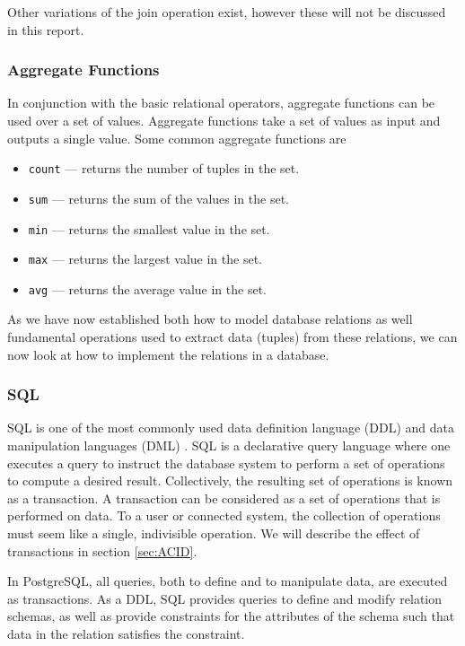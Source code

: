 Other variations of the join operation exist\cite{DBSBook}, however these will not be discussed in this report.\\
\subsubsection*{Aggregate Functions}
In conjunction with the basic relational operators, aggregate functions can be used over a set of values.
Aggregate functions take a set of values as input and outputs a single value\cite{DBSBook}. Some common aggregate functions are 
\begin{itemize} \label{aggregateFunctions}
    \item \texttt{count} --- returns the number of tuples in the set.
    \item \texttt{sum} --- returns the sum of the values in the set.
    \item \texttt{min} --- returns the smallest value in the set.
    \item \texttt{max} --- returns the largest value in the set.
    \item \texttt{avg} --- returns the average value in the set.
\end{itemize}


As we have now established both how to model database relations as well fundamental operations used to extract data (tuples) from these relations, we can now look at how to implement the relations in a database.

\subsubsection{SQL}\label{sec:SQL}
SQL is one of the most commonly used data definition language (DDL) and data manipulation languages (DML) \cite{DBSBook}.
SQL is a declarative query language where one executes a query to instruct the database system to perform a set of operations to compute a desired result.
Collectively, the resulting set of operations is known as a transaction.
A transaction can be considered as a set of operations that is performed on data.
To a user or connected system, the collection of operations must seem like a single, indivisible operation\cite{DBSBook}.
We will describe the effect of transactions in section \ref{sec:ACID}.


In PostgreSQL, all queries, both to define and to manipulate data, are executed as transactions\cite{postgres_transactions}.
As a DDL, SQL provides queries to define and modify relation schemas, as well as provide constraints for the attributes of the schema such that data in the relation satisfies the constraint.  

